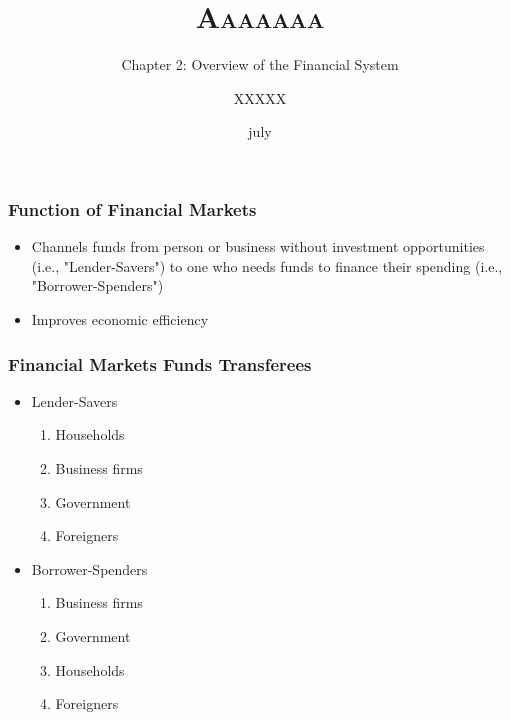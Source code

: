 \documentclass{beamer}
\title{\scshape Aaaaaaa}
\subtitle{Chapter 2: Overview of the Financial System}
\author{ \large XXXXX}
\institute[AAAAAAA] %
{
 \\ %
}
\date{july} %
\begin{document}
\begin{frame}
\titlepage %
\end{frame}






\begin{frame}
\frametitle{Function of Financial Markets}
\begin{itemize}
\item Channels funds from person or business without investment opportunities (i.e., "Lender-Savers") to one who needs funds to finance their spending (i.e., "Borrower-Spenders")
\vspace{\baselineskip}
\item Improves economic efficiency
\end{itemize}
\end{frame}



\begin{frame}
\frametitle{Financial Markets Funds Transferees}
\begin{itemize}
\item Lender-Savers
\begin{enumerate}
\item Households
\item Business firms
\item Government
\item Foreigners
\end{enumerate}

\vspace{\baselineskip}

\item Borrower-Spenders
\begin{enumerate}
\item Business firms
\item Government
\item Households
\item Foreigners
\end{enumerate}

\end{itemize}
\end{frame}
\end{document}
